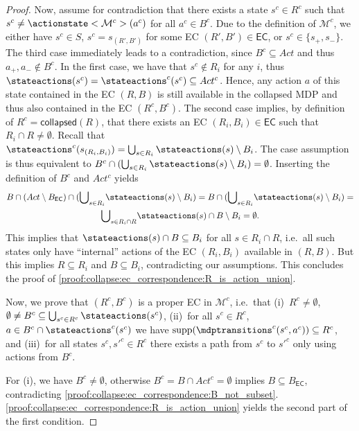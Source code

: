 \documentclass{article}
\newcommand{\intersectionSym}{\cap}
\newcommand{\intersectionBin}{\mathbin{\intersectionSym}}
\newcommand{\UnionSym}{\bigcup}
\newcommand{\intersection}{\intersectionBin}
\newcommand{\Union}{\UnionSym}
\newcommand{\MDP}{\mathcal{M}}
\newcommand{\States}{S}
\newcommand{\Actions}{Act}
\DeclareMathOperator{\support}{supp}
\newcommand{\targetstate}{s_+}
\newcommand{\sinkstate}{s_-}
\newcommand{\eccollapsed}{\mathsf{collapsed}}
\newcommand{\algoecs}{\mathsf{EC}}
\begin{document}
\begin{proof}
	Now, assume for contradiction that there exists a state $s^c \in R^c$ such that $s^c \neq \actionstate<\MDP^c>(a^c)$ for all $a^c \in B^c$.
	Due to the definition of $\MDP^c$, we either have $s^c \in \States$, $s^c = s_{(R', B')}$ for some EC $(R', B') \in \algoecs$, or $s^c \in \{\targetstate, \sinkstate\}$.
	The third case immediately leads to a contradiction, since $B^c \subseteq \Actions$ and thus $a_+, a_- \notin B^c$.
	In the first case, we have that $s^c \notin R_i$ for any $i$, thus $\stateactions(s^c) = \stateactions^c(s^c) \subseteq \Actions^c$.
	Hence, any action $a$ of this state contained in the EC $(R, B)$ is still available in the collapsed MDP and thus also contained in the EC $(R^c, B^c)$.
	The second case implies, by definition of $R^c = \eccollapsed(R)$, that there exists an EC $(R_i, B_i) \in \algoecs$ such that $R_i \intersection R \neq \emptyset$.
	Recall that $\stateactions^c(s_{(R_i, B_i)}) = \Union_{s \in R_i} \stateactions(s) \setminus B_i$.
	The case assumption is thus equivalent to $B^c \intersection (\Union_{s \in R_i} \stateactions(s) \setminus B_i) = \emptyset$.
	Inserting the definition of $B^c$ and $\Actions^c$ yields
	\begin{multline*}
		B \intersection (\Actions \setminus B_{\algoecs}) \intersection ({\Union}_{s \in R_i} \stateactions(s) \setminus B_i) = B \intersection ({\Union}_{s \in R_i} \stateactions(s) \setminus B_i) = \\
		{\Union}_{s \in R_i \intersection R} \stateactions(s) \intersection B \setminus B_i = \emptyset.
	\end{multline*}
	This implies that $\stateactions(s) \intersection B \subseteq B_i$ for all $s \in R_i \intersection R$, i.e.\ all such states only have \enquote{internal} actions of the EC $(R_i, B_i)$ available in $(R, B)$.
	But this implies $R \subseteq R_i$ and $B \subseteq B_i$, contradicting our assumptions.
	This concludes the proof of \ref{proof:collapse:ec_correspondence:R_is_action_union}.

	Now, we prove that $(R^c, B^c)$ is a proper EC in $\MDP^c$, i.e.\ that (i)~$R^c \neq \emptyset$, $\emptyset \neq B^c \subseteq \Union_{s^c \in R^c} \stateactions(s^c)$, (ii)~for all $s^c \in R^c$, $a \in B^c \intersection \stateactions^c(s^c)$ we have $\support(\mdptransitions^c(s^c, a^c)) \subseteq R^c$, and (iii)~for all states $s^c, s'^c \in R^c$ there exists a path from $s^c$ to $s'^c$ only using actions from $B^c$.

	For (i), we have $B^c \neq \emptyset$, otherwise $B^c = B \intersection \Actions^c = \emptyset$ implies $B \subseteq B_{\algoecs}$, contradicting \ref{proof:collapse:ec_correspondence:B_not_subset}.
	\ref{proof:collapse:ec_correspondence:R_is_action_union} yields the second part of the first condition.


\end{proof}
\end{document}
